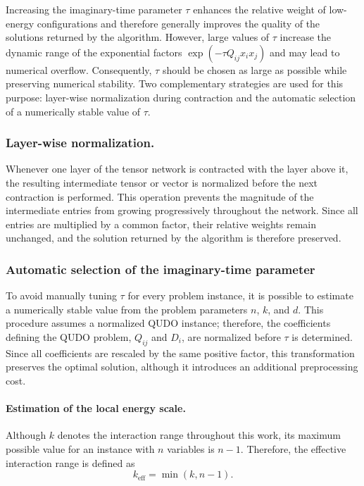 \documentclass[%
 reprint,
 amsmath,amssymb,
 aps,
 pra,showkeys,
]{revtex4-2}
\begin{document}
Increasing the imaginary-time parameter $\tau$ enhances the relative
weight of low-energy configurations and therefore generally improves
the quality of the solutions returned by the algorithm. However, large
values of $\tau$ increase the dynamic range of the exponential factors
$\exp\!\left(-\tau Q_{ij}x_i x_j\right)$ and may lead to numerical
overflow. Consequently, $\tau$ should be chosen as large as possible
while preserving numerical stability. Two complementary strategies are
used for this purpose: layer-wise normalization during contraction and
the automatic selection of a numerically stable value of $\tau$.

\subsubsection{Layer-wise normalization.}\label{sssec:Layer-wise normalization}
Whenever one layer of the tensor network is contracted with the layer
above it, the resulting intermediate tensor or vector is normalized
before the next contraction is performed. This operation prevents the
magnitude of the intermediate entries from growing progressively
throughout the network. Since all entries are multiplied by a common
factor, their relative weights remain unchanged, and the solution
returned by the algorithm is therefore preserved.

\subsubsection{Automatic selection of the imaginary-time parameter}\label{sssec:Automatic selection of the imaginary-time parameter}

To avoid manually tuning $\tau$ for every problem instance, it is possible to estimate a numerically stable value from the problem
parameters $n$, $k$, and $d$. This procedure assumes a normalized QUDO instance; therefore, the
coefficients defining the QUDO problem, $Q_{ij}$ and $D_i$, are
normalized before $\tau$ is determined. Since all coefficients are rescaled by the
same positive factor, this transformation preserves the optimal
solution, although it introduces an additional preprocessing cost.

\paragraph{Estimation of the local energy scale.}

Although $k$ denotes the interaction range throughout this work, its
maximum possible value for an instance with $n$ variables is $n-1$.
Therefore, the effective interaction range is defined as
\begin{equation}
    k_{\mathrm{eff}}=\min(k,n-1).
    \label{eq:effective-interaction-range}
\end{equation}
\end{document}
